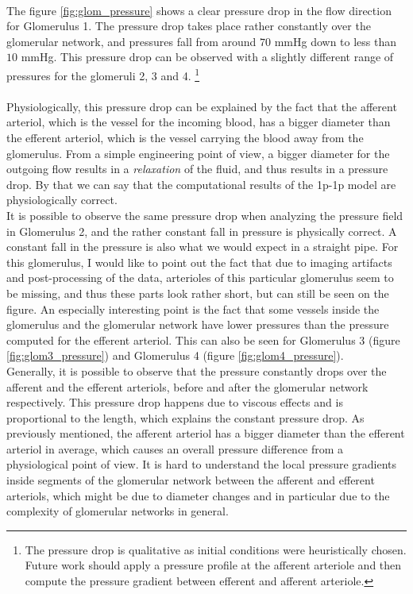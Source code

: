 \\The figure \ref{fig:glom_pressure} shows a clear pressure drop in the flow direction for Glomerulus 1. The pressure drop takes place rather constantly over the glomerular network, and pressures fall from around $70$ mmHg down to less than $10$ mmHg. This pressure drop can be observed with a slightly different range of pressures for the glomeruli 2, 3 and 4. \footnote{The
pressure drop is qualitative as initial conditions were heuristically chosen.
Future work should apply a pressure profile at the afferent arteriole and then
compute the pressure gradient between efferent and afferent arteriole.}
\\
\\Physiologically, this pressure drop can be explained by the fact that the afferent arteriol, which is the vessel for the incoming blood, has a bigger diameter than the efferent arteriol, which is the vessel carrying the blood away from the glomerulus. From a simple engineering point of view, a bigger diameter for the outgoing flow results in a \emph{relaxation} of the fluid, and thus results in a pressure drop. By that we can say that the computational results of the 1p-1p model are physiologically correct.
\\It is possible to observe the same pressure drop when analyzing the pressure field in Glomerulus 2, and the rather constant fall in pressure is physically correct. A constant fall in the pressure is also what we would expect in a straight pipe. For this glomerulus, I would like to point out the fact that due to imaging artifacts and post-processing of the data, arterioles of this particular glomerulus seem to be missing, and thus these parts look rather short, but can still be seen on the figure. An especially interesting point is the fact that some vessels inside the glomerulus and the glomerular network have lower pressures than the pressure computed for the efferent arteriol. This can also be seen for Glomerulus 3 (figure \ref{fig:glom3_pressure}) and Glomerulus 4 (figure \ref{fig:glom4_pressure}).
\\Generally, it is possible to observe that the pressure constantly drops over the afferent and the efferent arteriols, before and after the glomerular network respectively. This pressure drop happens due to viscous effects and is proportional to the length, which explains the constant pressure drop. As previously mentioned, the afferent arteriol has a bigger diameter than the efferent arteriol in average, which causes an overall pressure difference from a physiological point of view. It is hard to understand the local pressure gradients inside segments of the glomerular network between the afferent and efferent arteriols, which might be due to diameter changes and in particular due to the complexity of glomerular networks in general.
\\

